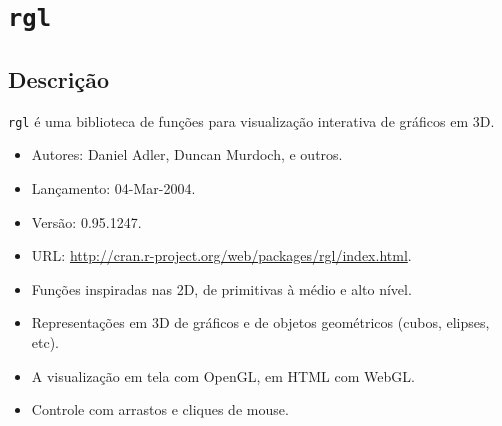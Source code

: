 \section{\texttt{rgl}}

\subsection{Descrição}


\begin{frame}

  \texttt{rgl} é uma biblioteca de funções para visualização
  interativa de gráficos em 3D.
  \vspace{2em}
  
  \begin{itemize}
  \item Autores: Daniel Adler, Duncan Murdoch, e outros.
  \item Lançamento: 04-Mar-2004.
  \item Versão: 0.95.1247.
  \item URL: \url{http://cran.r-project.org/web/packages/rgl/index.html}.
  \end{itemize}

\end{frame}


\begin{frame}
 
  \begin{itemize}
  \item Funções inspiradas nas 2D, de primitivas à médio e alto nível.
    \newline
    
  \item Representações em 3D de gráficos e de objetos geométricos
    (cubos, elipses, etc).
  \item A visualização em tela com OpenGL, em HTML com WebGL.
  \item Controle com arrastos e cliques de mouse.
  \end{itemize}
  \vspace{2em}

\end{frame}


